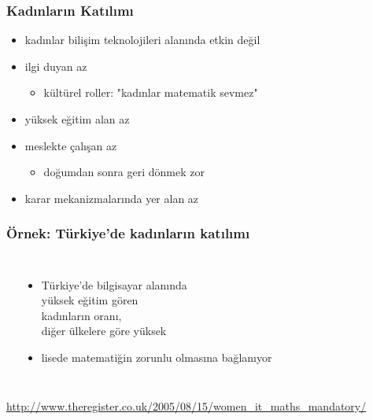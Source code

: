 \documentclass[dvipsnames]{beamer}
\theoremstyle{definition}
\theoremstyle{example}
\theoremstyle{plain}
\begin{document}
\begin{frame}
  \frametitle{Kadınların Katılımı}

  \begin{itemize}
    \item kadınlar bilişim teknolojileri alanında etkin değil

    \bigskip
    \item ilgi duyan az
    \begin{itemize}
      \item kültürel roller: "kadınlar matematik sevmez"
    \end{itemize}

    \pause
    \item yüksek eğitim alan az

    \pause
    \item meslekte çalışan az
    \begin{itemize}
      \item doğumdan sonra geri dönmek zor
    \end{itemize}

    \pause
    \item karar mekanizmalarında yer alan az
  \end{itemize}
\end{frame}

\begin{frame}
  \frametitle{Örnek: Türkiye'de kadınların katılımı}

  \begin{columns}
    \begin{center}
    \end{center}

    \begin{itemize}
      \item Türkiye'de bilgisayar alanında\\
        yüksek eğitim gören\\
        kadınların oranı,\\
        diğer ülkelere göre yüksek
      \item lisede matematiğin zorunlu olmasına bağlanıyor
    \end{itemize}
  \end{columns}

  \medskip
  \tiny{\url{http://www.theregister.co.uk/2005/08/15/women_it_maths_mandatory/}}\\
\end{frame}
\end{document}
